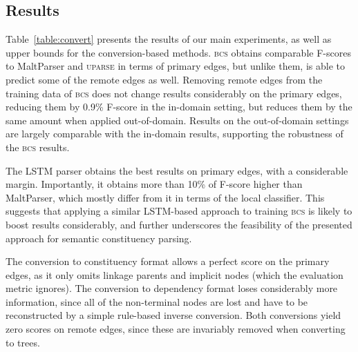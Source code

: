 \documentclass[11pt]{article}
\newcommand{\tabref}[1]{Table~\ref{#1}}
\begin{document}
\subsection{Results}

\tabref{table:convert} presents the results of our main experiments, as well as
upper bounds for the conversion-based methods.
\textsc{bcs} obtains comparable F-scores to MaltParser and \textsc{uparse}
in terms of primary edges, but unlike them, is able to predict some
of the remote edges as well. 
Removing remote edges from the training data of \textsc{bcs} does not
change results considerably on the primary edges,
reducing them by 0.9\% F-score in the in-domain setting, but reduces
them by the same amount when applied out-of-domain. Results on
the out-of-domain settings are largely comparable with the in-domain
results, supporting the robustness of the \textsc{bcs} results.

The LSTM parser obtains the best results on primary edges,
with a considerable margin. Importantly, it obtains more than
10\% of F-score higher than MaltParser, which mostly differ
from it in terms of the local classifier.
This suggests that applying a similar LSTM-based approach to
training \textsc{bcs} is likely to boost results considerably,
and further underscores the feasibility
of the presented approach for semantic constituency parsing. 



The conversion to constituency format allows a perfect score on the
primary edges, as it only omits linkage parents and implicit nodes (which the evaluation metric ignores).
The conversion to dependency format loses considerably more information, since all of the non-terminal nodes are lost and have to be reconstructed by a simple rule-based inverse conversion.
Both conversions yield zero scores on remote edges, since these are invariably removed when converting to trees.
\end{document}
